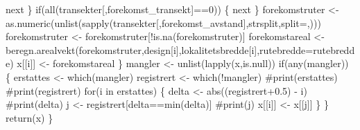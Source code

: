 \documentclass[
  letterpaper,
  DIV=11,
  numbers=noendperiod]{scrreport}
\newenvironment{Shaded}{\begin{snugshade}}{\end{snugshade}}
\newcommand{\AttributeTok}[1]{\textcolor[rgb]{0.40,0.45,0.13}{#1}}
\newcommand{\CommentTok}[1]{\textcolor[rgb]{0.37,0.37,0.37}{#1}}
\newcommand{\ControlFlowTok}[1]{\textcolor[rgb]{0.00,0.23,0.31}{#1}}
\newcommand{\DecValTok}[1]{\textcolor[rgb]{0.68,0.00,0.00}{#1}}
\newcommand{\FloatTok}[1]{\textcolor[rgb]{0.68,0.00,0.00}{#1}}
\newcommand{\FunctionTok}[1]{\textcolor[rgb]{0.28,0.35,0.67}{#1}}
\newcommand{\NormalTok}[1]{\textcolor[rgb]{0.00,0.23,0.31}{#1}}
\newcommand{\OtherTok}[1]{\textcolor[rgb]{0.00,0.23,0.31}{#1}}
\newcommand{\SpecialCharTok}[1]{\textcolor[rgb]{0.37,0.37,0.37}{#1}}
\newcommand{\StringTok}[1]{\textcolor[rgb]{0.13,0.47,0.30}{#1}}
\begin{document}
\begin{Shaded}
\begin{Highlighting}[]
      \ControlFlowTok{next}
\NormalTok{    \}}
    \ControlFlowTok{if}\NormalTok{(}\FunctionTok{all}\NormalTok{(transekter[,forekomst\_transekt]}\SpecialCharTok{==}\DecValTok{0}\NormalTok{))}
\NormalTok{    \{}
      \ControlFlowTok{next}
\NormalTok{    \}}
\NormalTok{    forekomstruter }\OtherTok{\textless{}{-}} \FunctionTok{as.numeric}\NormalTok{(}\FunctionTok{unlist}\NormalTok{(}\FunctionTok{sapply}\NormalTok{(transekter[,forekomst\_avstand],strsplit,}\AttributeTok{split=}\StringTok{\textquotesingle{},\textquotesingle{}}\NormalTok{)))}
\NormalTok{    forekomstruter }\OtherTok{\textless{}{-}}\NormalTok{ forekomstruter[}\SpecialCharTok{!}\FunctionTok{is.na}\NormalTok{(forekomstruter)]}
\NormalTok{    forekomstareal }\OtherTok{\textless{}{-}} \FunctionTok{beregn.arealvekt}\NormalTok{(forekomstruter,design[i],lokalitetsbredde[i],}\AttributeTok{rutebredde=}\NormalTok{rutebredde)}
\NormalTok{    x[[i]] }\OtherTok{\textless{}{-}}\NormalTok{ forekomstareal}
\NormalTok{  \}}
\NormalTok{  mangler }\OtherTok{\textless{}{-}} \FunctionTok{unlist}\NormalTok{(}\FunctionTok{lapply}\NormalTok{(x,is.null))}
  \ControlFlowTok{if}\NormalTok{(}\FunctionTok{any}\NormalTok{(mangler))}
\NormalTok{  \{}
\NormalTok{    erstattes }\OtherTok{\textless{}{-}} \FunctionTok{which}\NormalTok{(mangler)}
\NormalTok{    registrert }\OtherTok{\textless{}{-}} \FunctionTok{which}\NormalTok{(}\SpecialCharTok{!}\NormalTok{mangler)}
    \CommentTok{\#print(erstattes)}
    \CommentTok{\#print(registrert)}
    \ControlFlowTok{for}\NormalTok{(i }\ControlFlowTok{in}\NormalTok{ erstattes)}
\NormalTok{    \{}
\NormalTok{      delta }\OtherTok{\textless{}{-}} \FunctionTok{abs}\NormalTok{((registrert}\FloatTok{+0.5}\NormalTok{) }\SpecialCharTok{{-}}\NormalTok{ i)}
      \CommentTok{\#print(delta)}
\NormalTok{      j }\OtherTok{\textless{}{-}}\NormalTok{ registrert[delta}\SpecialCharTok{==}\FunctionTok{min}\NormalTok{(delta)]}
      \CommentTok{\#print(j)}
\NormalTok{      x[[i]] }\OtherTok{\textless{}{-}}\NormalTok{ x[[j]]}
\NormalTok{    \}}
\NormalTok{  \}}
  \FunctionTok{return}\NormalTok{(x)}
\NormalTok{\}}



\end{Highlighting}
\end{Shaded}
\end{document}
